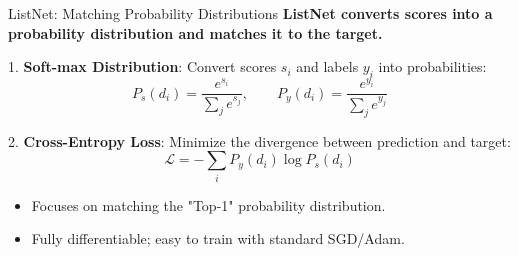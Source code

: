 \documentclass[aspectratio=169]{beamer}
\begin{document}

\begin{frame}{ListNet: Matching Probability Distributions}
\textbf{ListNet converts scores into a probability distribution and matches it to the target.}

\vspace{0.8em}
1. \textbf{Soft-max Distribution}: Convert scores $s_i$ and labels $y_i$ into probabilities:
\[
P_s(d_i) = \frac{e^{s_i}}{\sum_j e^{s_j}}, \qquad P_y(d_i) = \frac{e^{y_i}}{\sum_j e^{y_j}}
\]

2. \textbf{Cross-Entropy Loss}: Minimize the divergence between prediction and target:
\[
\mathcal{L} = -\sum_i P_y(d_i) \log P_s(d_i)
\]

\vspace{0.8em}
\begin{itemize}
    \item Focuses on matching the "Top-1" probability distribution.
    \item Fully differentiable; easy to train with standard SGD/Adam.
\end{itemize}
\end{frame}




\end{document}

